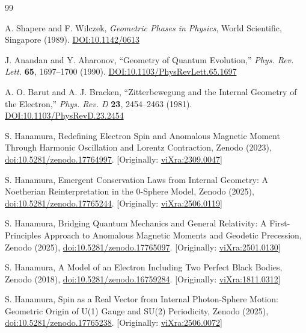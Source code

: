 \documentclass[%
 reprint,
 amsmath,amssymb,
 aps,
]{revtex4-1}
\numberwithin{equation}{section}%
\begin{document}
\begin{thebibliography}{99}

A. Shapere and F. Wilczek, \textit{Geometric Phases in Physics}, World Scientific, Singapore (1989). \href{https://doi.org/10.1142/0613}{DOI:10.1142/0613}

J. Anandan and Y. Aharonov, ``Geometry of Quantum Evolution,'' \textit{Phys. Rev. Lett.} \textbf{65}, 1697–1700 (1990). \href{https://doi.org/10.1103/PhysRevLett.65.1697}{DOI:10.1103/PhysRevLett.65.1697}

A. O. Barut and A. J. Bracken, ``Zitterbewegung and the Internal Geometry of the Electron,'' \textit{Phys. Rev. D} \textbf{23}, 2454–2463 (1981). \href{https://doi.org/10.1103/PhysRevD.23.2454}{DOI:10.1103/PhysRevD.23.2454}

S. Hanamura, Redefining Electron Spin and Anomalous Magnetic Moment Through Harmonic Oscillation and Lorentz Contraction, Zenodo (2023), \href{https://doi.org/10.5281/zenodo.17764997}{doi:10.5281/zenodo.17764997}. [Originally: \href{https://vixra.org/abs/2309.0047}{viXra:2309.0047}]

S. Hanamura, Emergent Conservation Laws from Internal Geometry: A Noetherian Reinterpretation in the 0-Sphere Model, Zenodo (2025), \href{https://doi.org/10.5281/zenodo.17765244}{doi:10.5281/zenodo.17765244}. [Originally: \href{https://vixra.org/abs/2506.0119}{viXra:2506.0119}]

S. Hanamura, Bridging Quantum Mechanics and General Relativity: A First-Principles Approach to Anomalous Magnetic Moments and Geodetic Precession, Zenodo (2025), \href{https://doi.org/10.5281/zenodo.17765097}{doi:10.5281/zenodo.17765097}. [Originally: \href{https://vixra.org/abs/2501.0130}{viXra:2501.0130}]

S. Hanamura, A Model of an Electron Including Two Perfect Black Bodies, Zenodo (2018), \href{https://doi.org/10.5281/zenodo.16759284}{doi:10.5281/zenodo.16759284}. [Originally: \href{https://vixra.org/abs/1811.0312}{viXra:1811.0312}]

S. Hanamura, Spin as a Real Vector from Internal Photon-Sphere Motion: Geometric Origin of U(1) Gauge and SU(2) Periodicity, Zenodo (2025), \href{https://doi.org/10.5281/zenodo.17765238}{doi:10.5281/zenodo.17765238}. [Originally: \href{https://vixra.org/abs/2506.0072}{viXra:2506.0072}]


\end{thebibliography}
\end{document}
